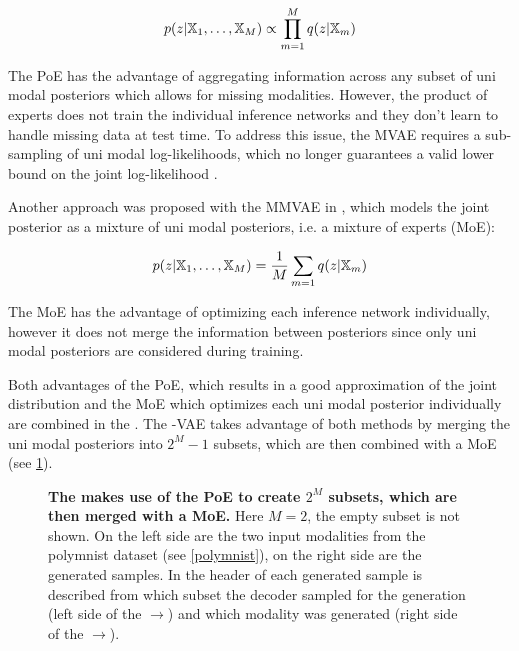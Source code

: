 \begin{equation}
    p(z|\mathbb{X}_1,\ldots,\mathbb{X}_M) \propto \prod ^M _{m=1} q(z|\mathbb{X}_m)
\end{equation}

The PoE has the advantage of aggregating information across any subset of uni modal posteriors which allows for missing modalities.
However, the product of experts does not train the individual inference networks and they don't learn to handle missing data at test time.
To address this issue, the MVAE requires a sub-sampling of uni modal log-likelihoods, which no longer guarantees a valid lower bound on the joint log-likelihood \parencite{wu_multimodal_2019}.

Another approach was proposed with the MMVAE in \citep{shi2019variational}, which models the joint posterior as a mixture of uni modal posteriors, i.e. a mixture of experts (MoE):

\begin{equation}
    p(z|\mathbb{X}_1,\ldots,\mathbb{X}_M) = \frac{1}{M} \sum _{m=1} q(z|\mathbb{X}_m)
\end{equation}

The MoE has the advantage of optimizing each inference network individually, however it does not merge the information between posteriors since only uni modal posteriors are considered during training.

Both advantages of the PoE, which results in a good approximation of the joint distribution and the MoE which optimizes each uni modal posterior individually are combined in the  \parencite{thomas_gener-ELBO}.
The -VAE takes advantage of both methods by merging the uni modal posteriors into $2^M - 1$ subsets, which are then combined with a MoE (see \cref{mopoeGraph}).

\begin{figure}[h!]
    \centering
    \caption{\textbf{The  makes use of the PoE to create $2^M$ subsets, which are then merged with a MoE.} Here $M=2$, the empty subset is not shown. On the left side are the two input modalities from the polymnist dataset (see \cref{polymnist}), on the right side are the generated samples. In the header of each generated sample is described from which subset the decoder sampled for the generation (left side of the $\rightarrow$) and which modality was generated (right side of the $\rightarrow$).}
    \label{mopoeGraph}
\end{figure}

